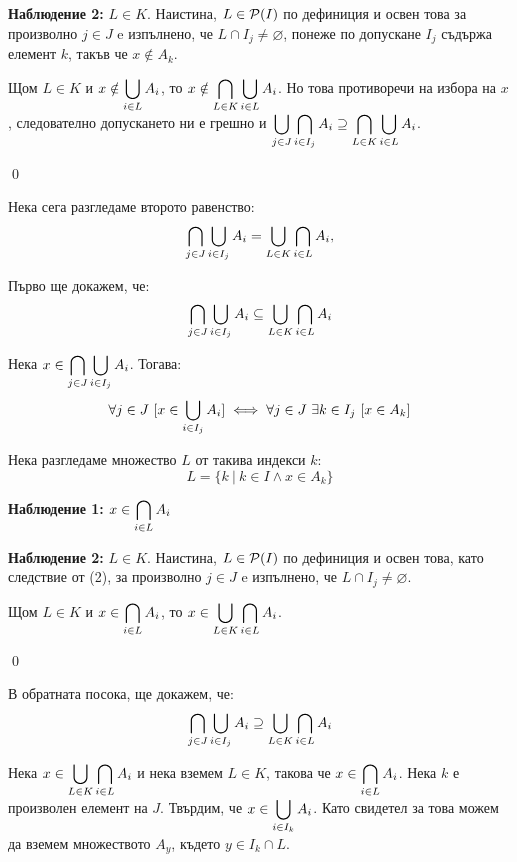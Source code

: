 \begin{problem}
\begin{tcolorbox}[mybox={Доказателство:}]
\quad
\textbf{Наблюдение 2:} $L \in K$.
Наистина, $L \in \mathcal{P}(I)$ по дефиниция и освен това за произволно $j \in J$ e изпълнено, че $L \cap I_j \neq \varnothing$,
понеже по допускане $I_j$ съдържа елемент $k$, такъв че $x \notin A_k$.

\bigbreak
\quad
Щом $L \in K$ и $\displaystyle x \notin \bigcup_{i \in L} A_i$, то
$\displaystyle x \notin \bigcap_{L \in K} \bigcup_{i \in L} A_i$.
Но това противоречи на избора на $x$, следователно допускането ни е грешно и
$\displaystyle \bigcup_{j \in J} \bigcap_{i \in I_j} A_i \supseteq \bigcap_{L \in K} \bigcup_{i \in L} A_i$.

\qed
\end{tcolorbox}

\bigbreak
\quad
Нека сега разгледаме второто равенство:
\[
\bigcap_{j \in J} \bigcup_{i \in I_j} A_i = \bigcup_{L \in K} \bigcap_{i \in L} A_i,
\]

\quad
Първо ще докажем, че:
\[
\bigcap_{j \in J} \bigcup_{i \in I_j} A_i \subseteq \bigcup_{L \in K} \bigcap_{i \in L} A_i
\]

\begin{tcolorbox}[mybox={Доказателство:}]
\quad
Нека
$\displaystyle x \in \bigcap_{j \in J} \bigcup_{i \in I_j} A_i$.
Тогава:
\begin{equation}
\forall j \in J \ [x \in \bigcup_{i \in I_j} A_i] \iff
\forall j \in J \ \exists k \in I_j\ [x \in A_k]
\end{equation}

\quad
Нека разгледаме множество $L$ от такива индекси $k$:
\[
L = \{k \ |\ k \in I \land x \in A_k\}
\]

\quad
\textbf{Наблюдение 1:} $\displaystyle x \in \bigcap_{i \in L} A_i$

\quad
\textbf{Наблюдение 2:} $L \in K$.
Наистина, $L \in \mathcal{P}(I)$ по дефиниция и освен това, като следствие от (2),
за произволно $j \in J$ e изпълнено, че $L \cap I_j \neq \varnothing$.

\bigbreak
\quad
Щом $L \in K$ и $\displaystyle x \in \bigcap_{i \in L} A_i$, то
$\displaystyle x \in \bigcup_{L \in K} \bigcap_{i \in L} A_i$.

\qed
\end{tcolorbox}

\bigbreak
\quad
В обратната посока, ще докажем, че:
\[
\bigcap_{j \in J} \bigcup_{i \in I_j} A_i \supseteq \bigcup_{L \in K} \bigcap_{i \in L} A_i
\]

\begin{tcolorbox}[mybox={Доказателство:}]
\quad
Нека $\displaystyle x \in \bigcup_{L \in K} \bigcap_{i \in L} A_i$ и нека вземем $L \in K$,
такова че $\displaystyle x \in \bigcap_{i \in L} A_i$.
Нека $k$ е произволен елемент на $J$.
Твърдим, че $\displaystyle x \in \bigcup_{i \in I_k} A_i$.
Като свидетел за това можем да вземем множеството $A_y$, където $y \in I_k \cap L$.


\end{tcolorbox}
\end{problem}
